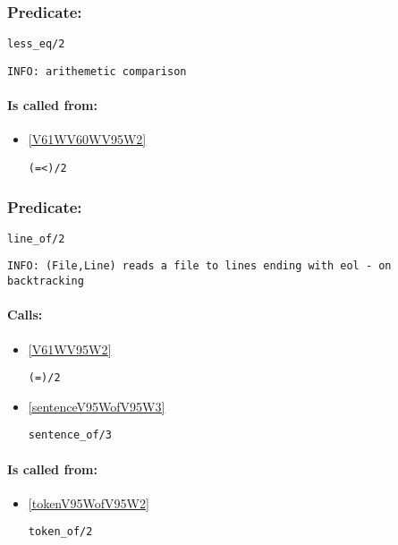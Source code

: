 \subsubsection{Predicate:} \label{lessV95WeqV95W2}

\begin{verbatim}
less_eq/2
\end{verbatim}

{\small \begin{verbatim}
INFO: arithemetic comparison

\end{verbatim}}
\paragraph{Is called from:} 
\begin{itemize}
\item \ref{V61WV60WV95W2} 
\begin{verbatim}
(=<)/2
\end{verbatim}

\end{itemize}

\subsubsection{Predicate:} \label{lineV95WofV95W2}

\begin{verbatim}
line_of/2
\end{verbatim}

{\small \begin{verbatim}
INFO: (File,Line) reads a file to lines ending with eol - on backtracking

\end{verbatim}}
\paragraph{Calls:} 
\begin{itemize}
\item \ref{V61WV95W2} 
\begin{verbatim}
(=)/2
\end{verbatim}

\item \ref{sentenceV95WofV95W3} 
\begin{verbatim}
sentence_of/3
\end{verbatim}

\end{itemize}
\paragraph{Is called from:} 
\begin{itemize}
\item \ref{tokenV95WofV95W2} 
\begin{verbatim}
token_of/2
\end{verbatim}

\end{itemize}

